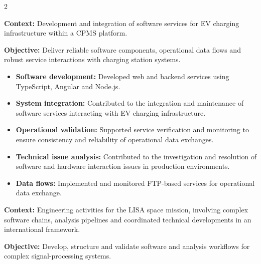\documentclass[8pt,a4paper,ragged2e,withhyper]{altacv}
\begin{document}
\begin{paracol}{2}


\textbf{Context:} Development and integration of software services for EV charging infrastructure within a CPMS platform.

\textbf{Objective:} Deliver reliable software components, operational data flows and robust service interactions with charging station systems.

\begin{itemize}
\item \textbf{Software development:} Developed web and backend services using TypeScript, Angular and Node.js.
\item \textbf{System integration:} Contributed to the integration and maintenance of software services interacting with EV charging infrastructure.
\item \textbf{Operational validation:} Supported service verification and monitoring to ensure consistency and reliability of operational data exchanges.
\item \textbf{Technical issue analysis:} Contributed to the investigation and resolution of software and hardware interaction issues in production environments.
\item \textbf{Data flows:} Implemented and monitored FTP-based services for operational data exchange.
\end{itemize}

\divider


\textbf{Context:} Engineering activities for the LISA space mission, involving complex software chains, analysis pipelines and coordinated technical developments in an international framework.

\textbf{Objective:} Develop, structure and validate software and analysis workflows for complex signal-processing systems.


\end{paracol}
\end{document}

